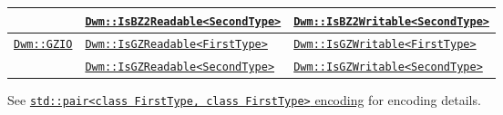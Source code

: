 \begin{minipage}{\textwidth}
\begin{small}
\begin{tabular}{lll}
 & \hyperref[concept:DwmIsBZ2Readable]{\texttt{Dwm::IsBZ2Readable<SecondType>}} & \hyperref[concept:DwmIsBZ2Writable]{\texttt{Dwm::IsBZ2Writable<SecondType>}} \\ \hline
\multirow{2}{*}{\hyperref[section:DwmGZIOClass]{\texttt{Dwm::GZIO}}} & \hyperref[concept:DwmIsGZReadable]{\texttt{Dwm::IsGZReadable<FirstType>}} & \hyperref[concept:DwmIsGZWritable]{\texttt{Dwm::IsGZWritable<FirstType>}} \\
 & \hyperref[concept:DwmIsGZReadable]{\texttt{Dwm::IsGZReadable<SecondType>}} & \hyperref[concept:DwmIsGZWritable]{\texttt{Dwm::IsGZWritable<SecondType>}} \\
\end{tabular}
\end{small}
\vspace{1ex}

See \hyperref[encoding:stdPair]{\texttt{std::pair<class FirstType, class FirstType>} encoding} for
encoding details.
\end{minipage}

